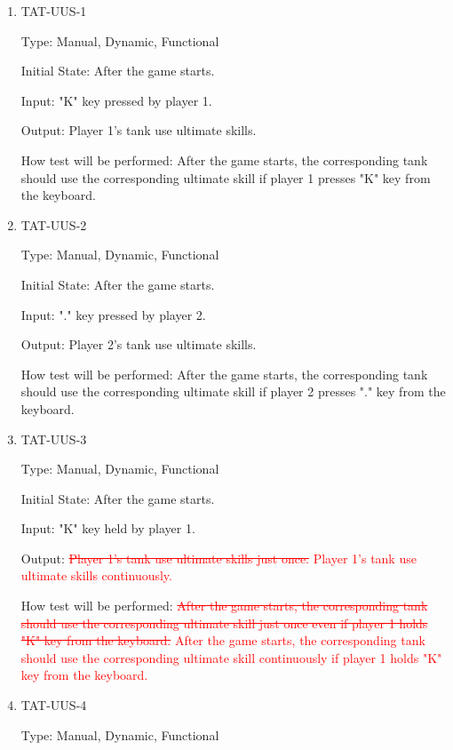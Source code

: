 \documentclass[12pt, titlepage]{article}
\begin{document}
\begin{enumerate}

\item{TAT-UUS-1\\}

Type: Manual, Dynamic, Functional
					
Initial State: After the game starts.
					
Input: "K" key pressed by player 1.
					
Output: Player 1's tank use ultimate skills.
					
How test will be performed: After the game starts, the corresponding tank should use the corresponding ultimate skill if player 1 presses "K" key from the keyboard.

\item{TAT-UUS-2\\}

Type: Manual, Dynamic, Functional
					
Initial State: After the game starts.
					
Input: "." key pressed by player 2.
					
Output: Player 2's tank use ultimate skills.
					
How test will be performed: After the game starts, the corresponding tank should use the corresponding ultimate skill if player 2 presses "." key from the keyboard.

\item{TAT-UUS-3\\}

Type: Manual, Dynamic, Functional
					
Initial State: After the game starts.
					
Input: "K" key held by player 1.
					
Output: \textcolor{red}{\sout{Player 1's tank use ultimate skills just once.}} \textcolor{red}{Player 1's tank use ultimate skills continuously.}
					
How test will be performed: \textcolor{red}{\sout{After the game starts, the corresponding tank should use the corresponding ultimate skill just once even if player 1 holds "K" key from the keyboard.}} \textcolor{red}{After the game starts, the corresponding tank should use the corresponding ultimate skill continuously if player 1 holds "K" key from the keyboard.}

\item{TAT-UUS-4\\}

Type: Manual, Dynamic, Functional
					

\end{enumerate}
\end{document}
